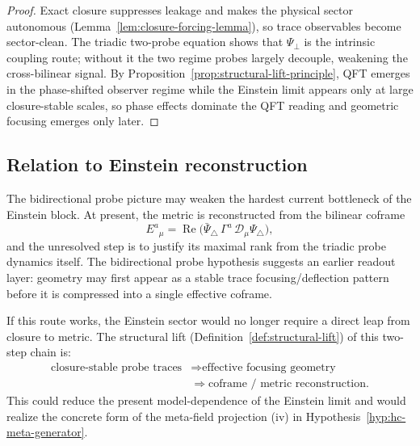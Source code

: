 \begin{proof}
Exact closure suppresses leakage and makes the physical sector
autonomous (Lemma~\ref{lem:closure-forcing-lemma}), so trace observables
become sector-clean. The triadic two-probe equation shows that
$\Psi_\perp$ is the intrinsic coupling route; without it the two regime
probes largely decouple, weakening the cross-bilinear signal. By
Proposition~\ref{prop:structural-lift-principle}, QFT emerges in the
phase-shifted observer regime while the Einstein limit appears only at
large closure-stable scales, so phase effects dominate the QFT reading
and geometric focusing emerges only later.
\end{proof}

\subsection*{Relation to Einstein reconstruction}

The bidirectional probe picture may weaken the hardest current
bottleneck of the Einstein block. At present, the metric is reconstructed
from the bilinear coframe
\[
  E^a{}_\mu
  =
  \operatorname{Re}\bigl(
    \bar\Psi_\triangle\,\Gamma^a\,\mathcal{D}_\mu\Psi_\triangle
  \bigr),
\]
and the unresolved step is to justify its maximal rank from the triadic
probe dynamics itself. The bidirectional probe hypothesis suggests an
earlier readout layer: geometry may first appear as a stable trace
focusing/deflection pattern before it is compressed into a single
effective coframe.

\begin{remark}
If this route works, the Einstein sector would no longer require a
direct leap from closure to metric. The structural lift
(Definition~\ref{def:structural-lift}) of this two-step chain is:
\[
\begin{aligned}
\text{closure-stable probe traces}
&\Longrightarrow \text{effective focusing geometry}\\
&\Longrightarrow \text{coframe / metric reconstruction}.
\end{aligned}
\]
This could reduce the present model-dependence of the Einstein limit and
would realize the concrete form of the meta-field projection
(iv) in Hypothesis~\ref{hyp:hc-meta-generator}.
\end{remark}



